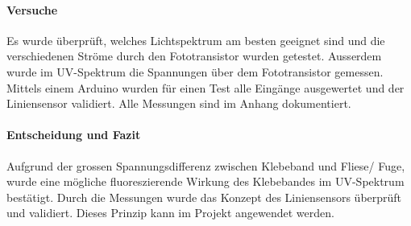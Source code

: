 \documentclass[main.tex]{subfiles} %
\begin{document}

\paragraph{Versuche}
Es wurde überprüft, welches Lichtspektrum am besten geeignet sind und die verschiedenen Ströme
durch den Fototransistor wurden getestet. Ausserdem wurde im UV-Spektrum die Spannungen über dem Fototransistor
gemessen. Mittels einem 
Arduino wurden für einen Test alle Eingänge ausgewertet und der Liniensensor validiert. 
Alle Messungen sind im Anhang dokumentiert.

\paragraph{Entscheidung und Fazit}
Aufgrund der grossen Spannungsdifferenz zwischen Klebeband und Fliese/ Fuge, wurde eine mögliche
fluoreszierende Wirkung des Klebebandes im UV-Spektrum bestätigt. Durch die Messungen wurde das 
Konzept des Liniensensors überprüft und validiert. Dieses Prinzip kann im Projekt angewendet
werden.
\end{document}
